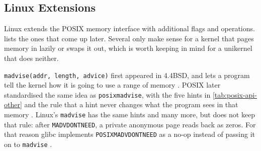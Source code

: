 \documentclass[12pt]{report}
\renewcommand{\_}{\origunderscore\allowbreak}
\begin{document}
\subsection{Linux Extensions}

Linux extends the POSIX memory interface with additional flags and operations.  lists the ones that come up later. Several only make sense for a kernel that pages memory in lazily or swaps it out, which is worth keeping in mind for a unikernel that does neither.

\texttt{madvise(addr, length, advice)} first appeared in 4.4BSD, and lets a program tell the kernel how it is going to use a range of memory \cite{linux-madvise-man}. POSIX later standardised the same idea as \texttt{posix\_madvise}, with the five hints in \cref{tab:posix-api-other} and the rule that a hint never changes what the program sees in that memory \cite{posix-madvise-man}. Linux's \texttt{madvise} has the same hints and many more, but does not keep that rule: after \texttt{MADV\_DONTNEED}, a private anonymous page reads back as zeros. For that reason glibc implements \texttt{POSIX\_MADV\_DONTNEED} as a no-op instead of passing it on to \texttt{madvise} \cite{posix-madvise-man}.
\end{document}
